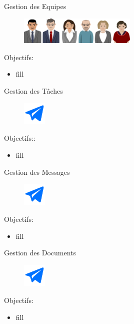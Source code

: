 \begin{frame}{Gestion des Equipes}
\begin{figure}[h!]
  \includegraphics[width=0.5\textwidth]{images/team}
\end{figure}
Objectifs:
  \begin{itemize}
\item fill
    \end{itemize}
\end{frame}

\begin{frame}{Gestion des Tâches}
\begin{figure}[h!]
  \includegraphics[width=0.10\textwidth]{images/-59-512}
\end{figure}
Objectifs::
  \begin{itemize}
\item fill
    \end{itemize}
\end{frame}

\begin{frame}{Gestion des Messages}
\begin{figure}[h!]
  \includegraphics[width=0.10\textwidth]{images/-59-512}
\end{figure}
Objectifs:
  \begin{itemize}
\item fill
    \end{itemize}
\end{frame}

\begin{frame}{Gestion des Documents}
\begin{figure}[h!]
  \includegraphics[width=0.10\textwidth]{images/-59-512}
\end{figure}
Objectifs:
  \begin{itemize}
\item fill
    \end{itemize}
\end{frame}


